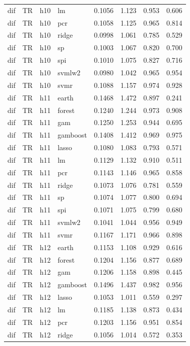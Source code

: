 \begin{ThreePartTable}
\begin{longtable}[t]{llclcccc}
dif & TR & h10 & lm & 0.1056 & 1.123 & 0.953 & 0.606\\
dif & TR & h10 & pcr & 0.1058 & 1.125 & 0.965 & 0.814\\
dif & TR & h10 & ridge & 0.0998 & 1.061 & 0.785 & 0.529\\
dif & TR & h10 & sp & 0.1003 & 1.067 & 0.820 & 0.700\\
dif & TR & h10 & spi & 0.1010 & 1.075 & 0.827 & 0.716\\
dif & TR & h10 & svmlw2 & 0.0980 & 1.042 & 0.965 & 0.954\\
dif & TR & h10 & svmr & 0.1088 & 1.157 & 0.974 & 0.928\\
\addlinespace
dif & TR & h11 & earth & 0.1468 & 1.472 & 0.897 & 0.241\\
dif & TR & h11 & forest & 0.1240 & 1.244 & 0.973 & 0.908\\
dif & TR & h11 & gam & 0.1250 & 1.253 & 0.944 & 0.695\\
dif & TR & h11 & gamboost & 0.1408 & 1.412 & 0.969 & 0.975\\
dif & TR & h11 & lasso & 0.1080 & 1.083 & 0.793 & 0.571\\
dif & TR & h11 & lm & 0.1129 & 1.132 & 0.910 & 0.511\\
dif & TR & h11 & pcr & 0.1143 & 1.146 & 0.965 & 0.858\\
dif & TR & h11 & ridge & 0.1073 & 1.076 & 0.781 & 0.559\\
dif & TR & h11 & sp & 0.1074 & 1.077 & 0.800 & 0.694\\
dif & TR & h11 & spi & 0.1071 & 1.075 & 0.799 & 0.680\\
dif & TR & h11 & svmlw2 & 0.1041 & 1.044 & 0.956 & 0.949\\
dif & TR & h11 & svmr & 0.1167 & 1.171 & 0.966 & 0.898\\
\addlinespace
dif & TR & h12 & earth & 0.1153 & 1.108 & 0.929 & 0.616\\
dif & TR & h12 & forest & 0.1204 & 1.156 & 0.877 & 0.689\\
dif & TR & h12 & gam & 0.1206 & 1.158 & 0.898 & 0.445\\
dif & TR & h12 & gamboost & 0.1496 & 1.437 & 0.982 & 0.956\\
dif & TR & h12 & lasso & 0.1053 & 1.011 & 0.559 & 0.297\\
dif & TR & h12 & lm & 0.1185 & 1.138 & 0.873 & 0.434\\
dif & TR & h12 & pcr & 0.1203 & 1.156 & 0.951 & 0.854\\
dif & TR & h12 & ridge & 0.1056 & 1.014 & 0.572 & 0.353\\

\end{longtable}
\end{ThreePartTable}
